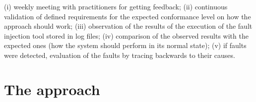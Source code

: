 \begin{itemize}
(i) weekly meeting with practitioners for getting feedback;
(ii) continuous validation of  defined requirements for the expected conformance level on how the approach should work; 
(iii) observation of the results of the execution of the fault injection tool stored in log files;
(iv) comparison of the observed results with the expected ones (how the system should perform in its normal state);
(v) if faults were detected, evaluation of the faults by tracing backwards to their causes.
\end{itemize}

\section{The \approach{} approach}\label{sec:approach}




